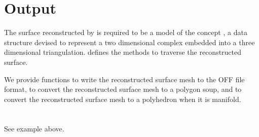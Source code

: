 \section{Output}

The surface reconstructed by  is required to be a model of the concept , a data structure devised to represent a two dimensional complex embedded into a three dimensional triangulation.  defines the methods to traverse the reconstructed surface.

We provide functions to write the reconstructed surface mesh to the OFF file format, to convert the reconstructed surface mesh to a polygon soup, and to convert the reconstructed surface mesh to a polyhedron when it is manifold.
  \\
  \\
  \\
See  example above.